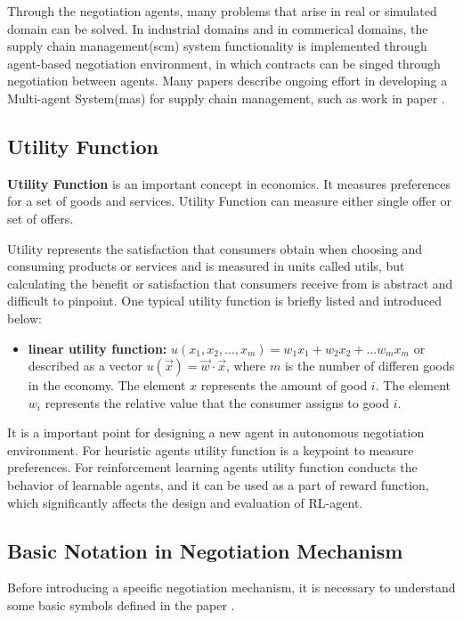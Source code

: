 Through the negotiation agents, many problems that arise in real or simulated domain can be solved. In industrial domains and in commerical domains, the supply chain management(\gls{scm}) system functionality is implemented through agent-based negotiation environment, in which contracts can be singed through negotiation between agents. Many papers describe ongoing effort in developing a Multi-agent System(\gls{mas}) for supply chain management, such as work in paper \parencite{Lee2004, Lin2014}.

\subsection{Utility Function}
\textbf{Utility Function} is an important concept in economics. It measures preferences for a set of goods and services. Utility Function can measure either single offer or set of offers.

Utility represents the satisfaction that consumers obtain when choosing and consuming products or services and is measured in units called utils, but calculating the benefit or satisfaction that consumers receive from is abstract and difficult to pinpoint\parencite{ANDRIY2019}. One typical utility function is briefly listed and introduced below:

\begin{itemize}
\item \textbf{linear utility function:} $u\left(x_{1}, x_{2}, \ldots, x_{m}\right)=w_{1} x_{1}+w_{2} x_{2}+\ldots w_{m} x_{m}$ or described as a vector $u(\vec{x})=\vec{w} \cdot \vec{x}$, where $m$ is the number of differen goods in the economy. The element $x$ represents the amount of good $i$. The element $w_i$ represents the relative value that the consumer assigns to good $i$.
\end{itemize}

It is a important point for designing a new agent in autonomous negotiation environment. For heuristic agents utility function is a keypoint to measure preferences. For reinforcement learning agents utility function conducts the behavior of learnable agents, and it can be used as a part of reward function, which significantly affects the design and evaluation of RL-agent.

\subsection{Basic Notation in Negotiation Mechanism} \label{background:autonmous-negotiation:basic-notation}
Before introducing a specific negotiation mechanism, it is necessary to understand some basic symbols defined in the paper \parencite{Aydoğan2017}.

